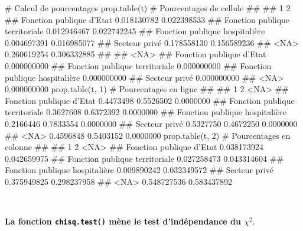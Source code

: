 \documentclass[12pt,twosided, notitlepage]{book}
\newenvironment{Shaded}{}{}
\newcommand{\CommentTok}[1]{\textcolor[rgb]{0.00,0.50,0.00}{#1}}
\newcommand{\DecValTok}[1]{#1}
\newcommand{\KeywordTok}[1]{\textcolor[rgb]{0.00,0.00,1.00}{#1}}
\newcommand{\NormalTok}[1]{#1}
\renewenvironment{Shaded}{\begin{snugshade}}{\end{snugshade}}
\begin{document}
\begin{Shaded}
\begin{Highlighting}[]
\CommentTok{# Calcul de pourcentages}
\KeywordTok{prop.table}\NormalTok{(t) }\CommentTok{# Pourcentages de cellule}
\NormalTok{  ##                                 }
\NormalTok{  ##                                            1           2}
\NormalTok{  ##   Fonction publique d'Etat       0.018130782 0.022398533}
\NormalTok{  ##   Fonction publique territoriale 0.012946467 0.022742245}
\NormalTok{  ##   Fonction publique hospitalière 0.004697391 0.016985077}
\NormalTok{  ##   Secteur privé                  0.178558130 0.156589236}
\NormalTok{  ##   <NA>                           0.260619254 0.306332885}
\NormalTok{  ##                                 }
\NormalTok{  ##                                         <NA>}
\NormalTok{  ##   Fonction publique d'Etat       0.000000000}
\NormalTok{  ##   Fonction publique territoriale 0.000000000}
\NormalTok{  ##   Fonction publique hospitalière 0.000000000}
\NormalTok{  ##   Secteur privé                  0.000000000}
\NormalTok{  ##   <NA>                           0.000000000}
\KeywordTok{prop.table}\NormalTok{(t, }\DecValTok{1}\NormalTok{) }\CommentTok{# Pourcentages en ligne}
\NormalTok{  ##                                 }
\NormalTok{  ##                                          1         2      <NA>}
\NormalTok{  ##   Fonction publique d'Etat       0.4473498 0.5526502 0.0000000}
\NormalTok{  ##   Fonction publique territoriale 0.3627608 0.6372392 0.0000000}
\NormalTok{  ##   Fonction publique hospitalière 0.2166446 0.7833554 0.0000000}
\NormalTok{  ##   Secteur privé                  0.5327750 0.4672250 0.0000000}
\NormalTok{  ##   <NA>                           0.4596848 0.5403152 0.0000000}
\KeywordTok{prop.table}\NormalTok{(t, }\DecValTok{2}\NormalTok{) }\CommentTok{# Pourcentages en colonne}
\NormalTok{  ##                                 }
\NormalTok{  ##                                            1           2 <NA>}
\NormalTok{  ##   Fonction publique d'Etat       0.038173924 0.042659975     }
\NormalTok{  ##   Fonction publique territoriale 0.027258473 0.043314604     }
\NormalTok{  ##   Fonction publique hospitalière 0.009890242 0.032349572     }
\NormalTok{  ##   Secteur privé                  0.375949825 0.298237958     }
\NormalTok{  ##   <NA>                           0.548727536 0.583437892}
\end{Highlighting}
\end{Shaded}

~

\textbf{La fonction \texttt{chisq.test()} mène le test d'indépendance du
\(\chi^2\)}.
\end{document}

